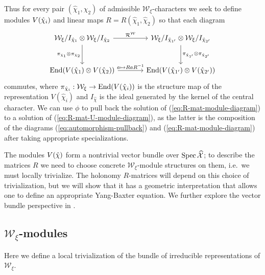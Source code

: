 \documentclass{sl2ams}
\numberwithin{equation}{section}
\newcommand{\W}{\mathcal{W}}
\newcommand{\R}{\mathcal{R}}
\begin{document}
Thus for every pair \((\hat \chi_{1}, \hat \chi_{2})\) of admissible \(\W_{\xi}\)-characters we seek to define modules \(V\mathopen{}\left(\hat \chi_{i}\right)\) and linear maps \(R = R(\hat \chi_{1}, \hat \chi_{2})\) so that each diagram 
\begin{equation}
  \label{eq:R-mat-module-diagram}
  \begin{tikzcd}[row sep = large, column sep = large]
    \W_\xi / I_{\hat \chi_{1}}
    \otimes
    \W_\xi / I_{\hat \chi_{2}}
    \arrow[r, "\R^{\W}"] \arrow[d, swap, "\pi_{\hat \chi_1} \otimes \pi_{\hat \chi_2}"] &
    \W_\xi / I_{\hat \chi_{1'}}
    \otimes
    \W_\xi / I_{\hat \chi_{2'}}
    \arrow[d, "\pi_{\hat \chi_{1'}} \otimes \pi_{\hat \chi_{2'}}"] \\
    \End(V(\hat \chi_{1}) \otimes V(\hat \chi_{2})) \arrow[r, "a \mapsto R a R^{-1}"] & \End(V(\hat \chi_{1'}) \otimes V(\hat \chi_{2'}))
  \end{tikzcd}
\end{equation}
commutes, where $\pi_{\hat \chi_i} : \W_\xi \to \End(V(\hat \chi_i))$ is the structure map of the representation $V(\hat \chi_i)$ and \(I_{\hat \chi}\) is the ideal generated by the kernel of the central character.
We can use $\phi$ to pull back the solution of (\ref{eq:R-mat-module-diagram}) to a solution of (\ref{eq:R-mat-U-module-diagram}), as the latter is the composition of the diagrams (\ref{eq:automorphism-pullback}) and (\ref{eq:R-mat-module-diagram}) after taking appropriate specializations.

The modules \(V\mathopen{}\left(\hat \chi\right)\) form a nontrivial vector bundle over \(\operatorname{Spec} \widehat{\mathcal{X}}\); to describe the matrices \(R\) we need to choose concrete \(\W_{\xi}\)-module structures on them, i.e.\ we must locally trivialize.
The holonomy \(R\)-matrices will depend on this choice of trivialization, but we will show that it has a geometric interpretation that allows one to define an appropriate Yang-Baxter equation.
We further explore the vector bundle perspective in \cite{McPhailSnyderVolume}.

\subsection{\texorpdfstring{\(\W_\xi\)}{Wξ}-modules}
\label{sec:cyclic-reps}

Here we define a local trivialization of the bundle of irreducible representations of \(\W_{\xi}\).
\end{document}
